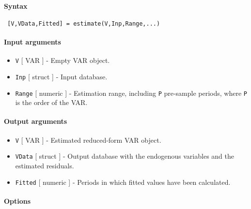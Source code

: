


	\paragraph{Syntax}
 
 \begin{verbatim}
 [V,VData,Fitted] = estimate(V,Inp,Range,...)
 \end{verbatim}
 
 \paragraph{Input arguments}
 
 \begin{itemize}
 \item
   \texttt{V} {[} VAR {]} - Empty VAR object.
 \item
   \texttt{Inp} {[} struct {]} - Input database.
 \item
   \texttt{Range} {[} numeric {]} - Estimation range, including
   \texttt{P} pre-sample periods, where \texttt{P} is the order of the
   VAR.
 \end{itemize}
 
 \paragraph{Output arguments}
 
 \begin{itemize}
 \item
   \texttt{V} {[} VAR {]} - Estimated reduced-form VAR object.
 \item
   \texttt{VData} {[} struct {]} - Output database with the endogenous
   variables and the estimated residuals.
 \item
   \texttt{Fitted} {[} numeric {]} - Periods in which fitted values have
   been calculated.
 \end{itemize}
 
 \paragraph{Options}
 
